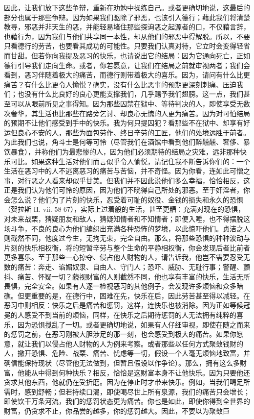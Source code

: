 因此，让我们放下这些争辩，重新在劝勉中操练自己。或者更确切地说，这最后的部分也属于那些争辩。因为如果我们驱除了邪恶，也该引入德行；藉此我们将清楚教导，邪恶并非天生的恶，并能轻易堵住那些探询恶之起源者的口，不仅藉言辞，也藉行为，因为我们与他们共享同一本性，却从他们的邪恶中得解脱。所以，不要只看德行的劳苦，也要看其成功的可能性。只要我们认真对待，它立时会变得轻省而甘甜。但若你向我提及恶习的快乐，也请说出它的结局：因为它通向死亡，正如德行引导我们走向生命。或者，你若愿意，让我们在结局之前就审视两者；我们会看到，恶习伴随着极大的痛苦，而德行则带着极大的喜乐。因为，请问有什么比更痛苦？有什么比更令人愉悦？确实，没有什么比恶事的预期更深刻刺痛、压迫我们；也没有什么比良好的良心更能支撑我们，几乎赐予我们翅膀。这一点，我们甚至可以从眼前所见之事得知。因为那些囚禁在狱中、等待判决的人，即使享受无数次奢华，其生活也比那些在路旁乞讨、却良心无愧的人更为痛苦。因为对可怕结局的预期不让他们感受到手中的快乐。我为何只提囚犯？看那些不在狱中、却享有好运但良心不安的人，那些为面包劳作、终日辛劳的工匠，他们的处境远胜于前者。为此我们也说，角斗士是何等可怜（尽管我们在酒馆中看到他们醉醺醺、奢侈、暴饮暴食），并称他们为最悲惨的人，因为他们必须期待的结局之灾难，远非那种快乐可比。如果这种生活对他们而言似乎令人愉悦，请记住我不断告诉你们的：一个生活在恶习中的人不逃离恶习的痛苦与苦恼，并不奇怪。因为你看，连如此可憎之事，对行恶之人看来却似乎甘美。但我们并不因此说他们多么幸福，恰恰相反，这正是我们认为他们可怜的原因，因为他们不晓得自己所处的邪恶。至于奸淫者，你会怎么说？他们为了片刻的快乐，忍受着可耻的奴役、金钱的损失和永久的恐惧（贺拉斯  II. vii. 58-67），实际上过着般的生活，甚至更糟：充满对现在的恐惧，对未来战栗，猜疑朋友和敌人，猜疑知情者和不知情者；即便入睡，也不得摆脱这场斗争，不良的良心为他们编织出充满各种恐怖的梦境，以此惊吓他们。贞洁之人则截然不同，他度过今生，无拘无束，完全自由。那么，将那些恐惧的种种波动与片刻的快乐相权衡，将的短暂辛劳与整个生命的平静相权衡，你会发现后者比前者更多喜乐。至于那些一心掠夺、侵占他人财物的人，请告诉我，他岂不需要忍受无数的痛苦：奔走、谄媚奴隶、自由人、守门人；恐吓、威胁、无耻行事；警醒、颤抖、痛苦、怀疑一切？藐视财富的人则截然不同，他也享有丰富的快乐，生活无所畏惧，完全安全。如果有人逐一检视恶习的其他例子，会发现许多烦恼和众多暗礁。但更重要的是，在德行中，困难在先，快乐在后，因此劳苦甚至得以减轻。在恶习中则相反：快乐之后是痛苦和惩罚，这样，连快乐也被消除。因为正如等候冠冕的人感受不到当前的烦恼，同样，在快乐之后期待惩罚的人无法拥有纯粹的喜乐，因为恐惧搅乱了一切。或者更确切地说，如果有人仔细审视，即使在随之而来的惩罚之前，在恶习刚被大胆涉足的那一刻，也会感受到极大的痛苦。如果你愿意，就让我们以侵占他人财物的人为例来考察。或者那些以任何方式聚敛钱财的人，撇开恐惧、危险、战栗、痛苦、忧虑等一切，假设一个人毫无烦恼地致富，并确信能保持现状（尽管他无法做到，但暂且假设以作争论）。那么，拥有这么多财富，他能从中得到何种快乐？相反，恰恰是这财富本身不让他快乐。因为只要他还贪求其他东西，他就仍在受折磨。因为在停止时才带来快乐。例如，当我们喝足所需时，感到舒畅；但若持续口渴，即使喝尽世上所有泉源，我们的痛苦只会增长；即使饮干万条河流，我们的惩罚状态更为痛苦。你也是如此，即使你得到全世界的财富，仍贪求不止，你品尝的越多，你的惩罚越大。因此，不要以为聚敛巨